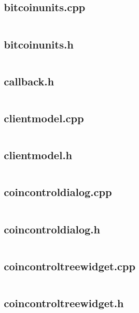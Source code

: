 \documentclass{article}
\begin{document}
\subsection{bitcoinunits.cpp}
\inputminted{cpp}{/home/dufferzafar/dev/@clones/bitcoin/src/qt/bitcoinunits.cpp}
\newpage

\subsection{bitcoinunits.h}
\inputminted{cpp}{/home/dufferzafar/dev/@clones/bitcoin/src/qt/bitcoinunits.h}
\newpage

\subsection{callback.h}
\inputminted{cpp}{/home/dufferzafar/dev/@clones/bitcoin/src/qt/callback.h}
\newpage

\subsection{clientmodel.cpp}
\inputminted{cpp}{/home/dufferzafar/dev/@clones/bitcoin/src/qt/clientmodel.cpp}
\newpage

\subsection{clientmodel.h}
\inputminted{cpp}{/home/dufferzafar/dev/@clones/bitcoin/src/qt/clientmodel.h}
\newpage

\subsection{coincontroldialog.cpp}
\inputminted{cpp}{/home/dufferzafar/dev/@clones/bitcoin/src/qt/coincontroldialog.cpp}
\newpage

\subsection{coincontroldialog.h}
\inputminted{cpp}{/home/dufferzafar/dev/@clones/bitcoin/src/qt/coincontroldialog.h}
\newpage

\subsection{coincontroltreewidget.cpp}
\inputminted{cpp}{/home/dufferzafar/dev/@clones/bitcoin/src/qt/coincontroltreewidget.cpp}
\newpage

\subsection{coincontroltreewidget.h}
\inputminted{cpp}{/home/dufferzafar/dev/@clones/bitcoin/src/qt/coincontroltreewidget.h}
\newpage
\end{document}
